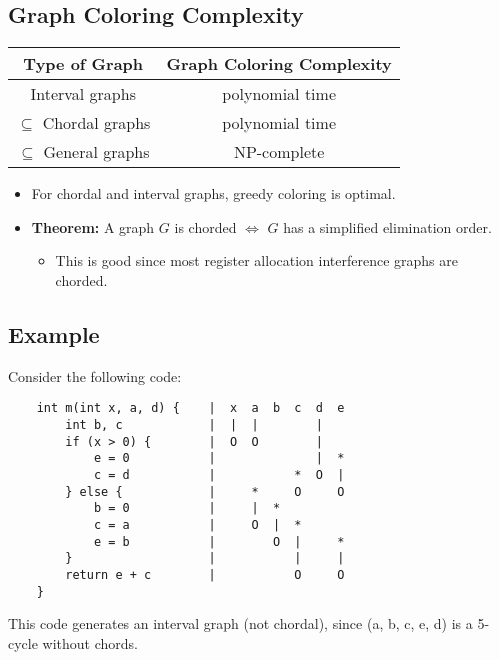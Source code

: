 \documentclass[10pt]{article}
\begin{document}
\subsection*{Graph Coloring Complexity}
\begin{tabular}{c | c }
    Type of Graph & Graph Coloring Complexity \\
    \hline
    Interval graphs & polynomial time \\
    $\subseteq$ Chordal graphs & polynomial time \\
    $\subseteq$ General graphs & NP-complete 
\end{tabular}
\begin{itemize}
    \item For chordal and interval graphs, greedy coloring is optimal.
    \item \textbf{Theorem:} A graph $G$ is chorded $\Longleftrightarrow$ $G$ has a simplified elimination order.
    \begin{itemize}
        \item This is good since most register allocation interference graphs are chorded.
    \end{itemize}
\end{itemize}

\subsection*{Example}
Consider the following code:
\begin{verbatim}
    int m(int x, a, d) {    |  x  a  b  c  d  e 
        int b, c            |  |  |        |  
        if (x > 0) {        |  O  O        |
            e = 0           |              |  *
            c = d           |           *  O  |
        } else {            |     *     O     O
            b = 0           |     |  *  
            c = a           |     O  |  *
            e = b           |        O  |     *
        }                   |           |     |
        return e + c        |           O     O
    }
\end{verbatim}

This code generates an interval graph (not chordal), since (a, b, c, e, d) is a 5-cycle without chords.
\end{document}
